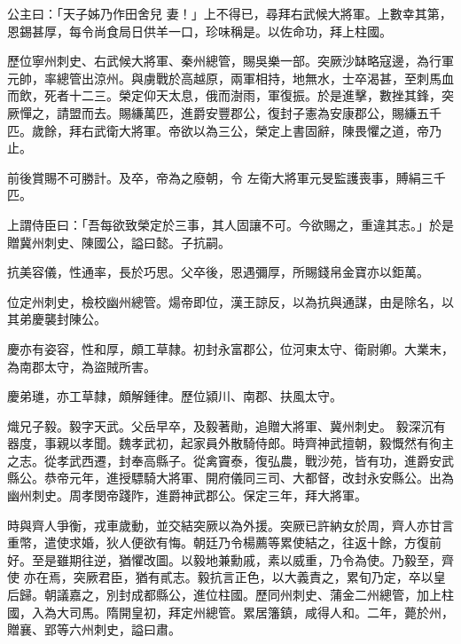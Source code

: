 \begin{pinyinscope}
 公主曰：「天子姊乃作田舍兒
 妻！」上不得已，尋拜右武候大將軍。上數幸其第，恩錫甚厚，每令尚食局日供羊一口，珍味稱是。以佐命功，拜上柱國。



 歷位寧州刺史、右武候大將軍、秦州總管，賜吳樂一部。突厥沙缽略寇邊，為行軍元帥，率總管出涼州。與虜戰於高越原，兩軍相持，地無水，士卒渴甚，至刺馬血而飲，死者十二三。榮定仰天太息，俄而澍雨，軍復振。於是進擊，數挫其鋒，突厥憚之，請盟而去。賜縑萬匹，進爵安豐郡公，復封子憲為安康郡公，賜縑五千匹。歲餘，拜右武衛大將軍。帝欲以為三公，榮定上書固辭，陳畏懼之道，帝乃止。



 前後賞賜不可勝計。及卒，帝為之廢朝，令
 左衛大將軍元旻監護喪事，賻絹三千匹。



 上謂侍臣曰：「吾每欲致榮定於三事，其人固讓不可。今欲賜之，重違其志。」於是贈冀州刺史、陳國公，謚曰懿。子抗嗣。



 抗美容儀，性通率，長於巧思。父卒後，恩遇彌厚，所賜錢帛金寶亦以鉅萬。



 位定州刺史，檢校幽州總管。煬帝即位，漢王諒反，以為抗與通謀，由是除名，以其弟慶襲封陳公。



 慶亦有姿容，性和厚，頗工草隸。初封永富郡公，位河東太守、衛尉卿。大業末，為南郡太守，為盜賊所害。



 慶弟璡，亦工草隸，頗解鍾律。歷位潁川、南郡、扶風太守。



 熾兄子毅。毅字天武。父岳早卒，及毅著勛，追贈大將軍、冀州刺史。
 毅深沉有器度，事親以孝聞。魏孝武初，起家員外散騎侍郎。時齊神武擅朝，毅慨然有徇主之志。從孝武西遷，封奉高縣子。從禽竇泰，復弘農，戰沙苑，皆有功，進爵安武縣公。恭帝元年，進授驃騎大將軍、開府儀同三司、大都督，改封永安縣公。出為幽州刺史。周孝閔帝踐阼，進爵神武郡公。保定三年，拜大將軍。



 時與齊人爭衡，戎車歲動，並交結突厥以為外援。突厥已許納女於周，齊人亦甘言重幣，遣使求婚，狄人便欲有悔。朝廷乃令楊薦等累使結之，往返十餘，方復前好。至是雖期往逆，猶懼改圖。以毅地兼勳戚，素以威重，乃令為使。乃毅至，齊使
 亦在焉，突厥君臣，猶有貳志。毅抗言正色，以大義責之，累旬乃定，卒以皇后歸。朝議嘉之，別封成都縣公，進位柱國。歷同州刺史、蒲金二州總管，加上柱國，入為大司馬。隋開皇初，拜定州總管。累居籓鎮，咸得人和。二年，薨於州，贈襄、郢等六州刺史，謚曰肅。




\end{pinyinscope}
